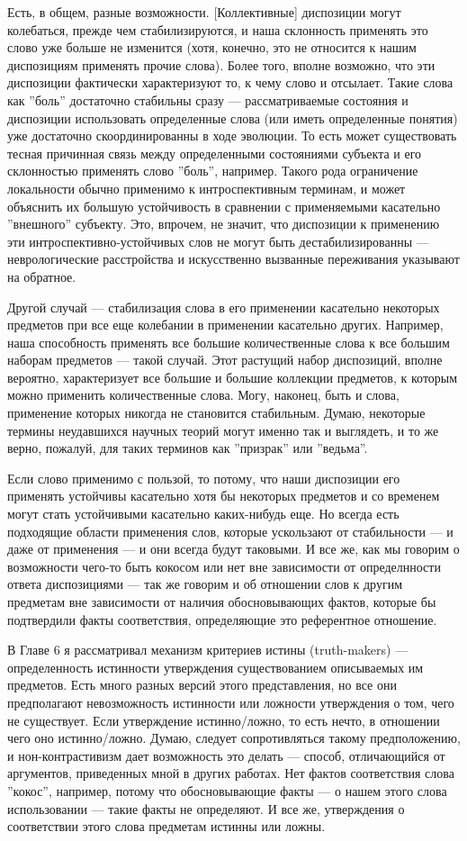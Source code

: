 \documentclass[11pt]{book}
\begin{document}
Есть, в общем, разные возможности. [Коллективные] диспозиции могут колебаться, прежде чем стабилизируются, и наша склонность применять это слово уже больше не изменится (хотя, конечно, это не относится к нашим диспозициям применять прочие слова). Более того, вполне возможно, что эти диспозиции фактически характеризуют то, к чему слово и отсылает. Такие слова как ''боль'' достаточно стабильны сразу --- рассматриваемые состояния и диспозиции использовать определенные слова (или иметь определенные понятия) уже достаточно скоординированны в ходе эволюции. То есть может существовать тесная причинная связь между определенными состояниями субъекта и его склонностью применять слово ''боль'', например. Такого рода ограничение локальности обычно применимо к интроспективным терминам, и может объяснить их большую устойчивость в сравнении с применяемыми касательно ''внешного'' субъекту. Это, впрочем, не значит, что диспозиции к применению эти интроспективно-устойчивых слов не могут быть дестабилизированны --- неврологические расстройства и искусственно вызванные переживания указывают на обратное.

Другой случай --- стабилизация слова в его применении касательно некоторых предметов при все еще колебании в применении касательно других. Например, наша способность применять все большие количественные слова к все большим наборам предметов --- такой случай. Этот растущий набор диспозиций, вполне вероятно, характеризует все большие и большие коллекции предметов, к которым можно применить количественные слова. Могу, наконец, быть и слова, применение которых никогда не становится стабильным. Думаю, некоторые термины неудавшихся научных теорий могут именно так и выглядеть, и то же верно, пожалуй, для таких терминов как ''призрак'' или ''ведьма''.

Если слово применимо с пользой, то потому, что наши диспозиции его применять устойчивы касательно хотя бы некоторых предметов и со временем могут стать устойчивыми касательно каких-нибудь еще. Но всегда есть подходящие области применения слов, которые ускользают от стабильности --- и даже от применения --- и они всегда будут таковыми. И все же, как мы говорим о возможности чего-то быть кокосом или нет вне зависимости от определнности ответа диспозициями --- так же говорим и об отношении слов к другим предметам вне зависимости от наличия обосновывающих фактов, которые бы подтвердили факты соответствия, определяющие это референтное отношение.

В Главе 6 я рассматривал механизм критериев истины (truth-makers) --- определенность истинности утверждения существованием описываемых им предметов. Есть много разных версий этого представления, но все они предполагают невозможность истинности или ложности утверждения о том, чего не существует. Если утверждение истинно/ложно, то есть нечто, в отношении чего оно истинно/ложно. Думаю, следует сопротивляться такому предположению, и нон-контрастивизм дает возможность это делать --- способ, отличающийся от аргументов, приведенных мной в других работах. Нет фактов соответствия слова ''кокос'', например, потому что обосновывающие факты --- о нашем этого слова использовании --- такие факты не определяют. И все же, утверждения о соответствии этого слова предметам истинны или ложны.
\end{document}
